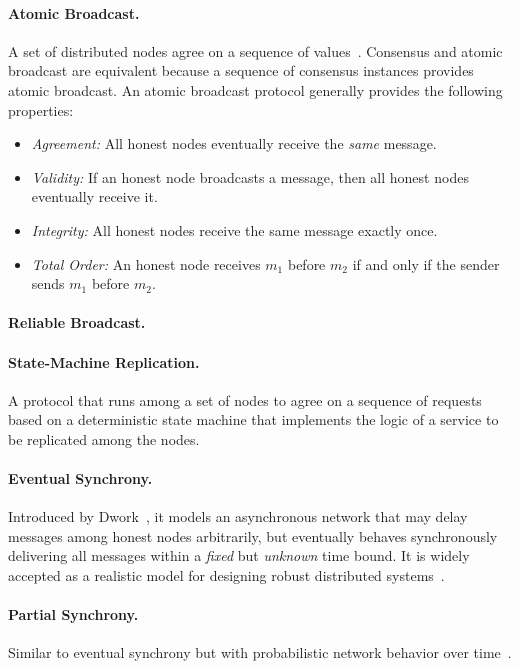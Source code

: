 \documentclass[11pt]{article}
\theoremstyle{mytheoremstyle}
\begin{document}
\paragraph{Atomic Broadcast.}
A set of distributed nodes agree on a sequence of values~\cite{AtomicBroadcast:1993}. Consensus and atomic broadcast are equivalent because a sequence of consensus instances provides atomic broadcast. An atomic broadcast protocol generally provides the following properties:
\begin{itemize}
	\item \textit{Agreement:} All honest nodes eventually receive the \emph{same} message.
	\item \textit{Validity:} If an honest node broadcasts a message, then all honest nodes eventually receive it.
	\item \textit{Integrity:} All honest nodes receive the same message exactly once.
	\item \textit{Total Order:} An honest node receives $m_1$ before $m_2$ if and only if the sender sends $m_1$ before $m_2$.
\end{itemize}

\paragraph{Reliable Broadcast.}

\paragraph{State-Machine Replication.}
A protocol that runs among a set of nodes to agree on a sequence of requests based on a deterministic state machine that implements the logic of a service to be replicated among the nodes.

\paragraph{Eventual Synchrony.} Introduced by Dwork~\cite{dwork:1988:cpp}, it models an asynchronous network that may delay messages among honest nodes arbitrarily, but eventually behaves synchronously delivering all messages within a \emph{fixed} but \emph{unknown} time bound. It is widely accepted as a realistic model for designing robust distributed systems~\cite{DBLP:journals/corr/CachinV17}.

\paragraph{Partial Synchrony.} Similar to eventual synchrony but with probabilistic network behavior over time~\cite{dwork:1988:cpp}.
\end{document}
